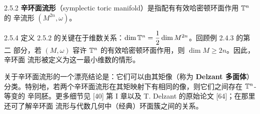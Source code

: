 \begin{wdefn}{2.5.2}
\textbf{辛环面流形}（symplectic toric manifold）是指配有有效哈密顿环面作用 $\mathbb{T}^n$ 的
辛流形 $(M^{2n},\omega)$。
\end{wdefn}

\begin{wrem}{2.5.4}
定义 2.5.2 的关键在于维数关系：$\dim\mathbb{T}^n=\dfrac12\dim M^{2n}$。回顾例 2.4.3 的第二
部分，若 $(M,\omega)$ 容许 $\mathbb{T}^n$ 的有效哈密顿环面作用，则 $\dim M\ge2n$。因此，辛环面
流形被定义为这一最小维数的情形。
\end{wrem}

关于辛环面流形的一个漂亮结论是：它们可以由其矩像（称为 \textbf{Delzant 多面体}）
分类。特别地，若两个辛环面流形在其矩映射下有相同的像，则它们之间存在 $\mathbb{T}^n$-等变的
辛同胚。更多细节见 [40] 第 I 章以及 T. Delzant 的原始论文 [64]；在那里还可了解辛环面
流形与代数几何中（经典）环面簇之间的关系。
